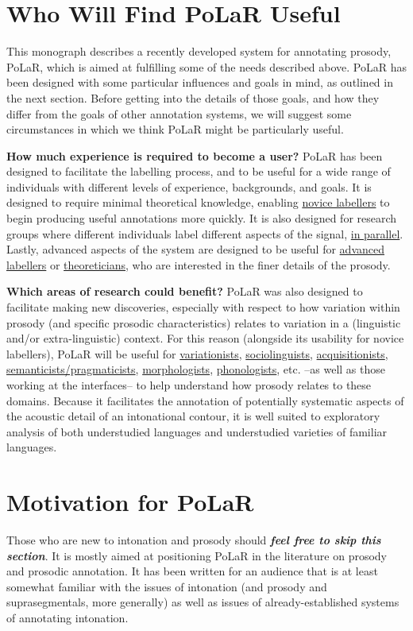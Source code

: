 \documentclass[11pt, twoside]{memoir}
\begin{document}
\section{Who Will Find PoLaR Useful}\label{sec:who-will-find-polar-useful}

This monograph describes a recently developed system for annotating prosody, PoLaR, which is  aimed at fulfilling some of the needs described above. PoLaR has been designed with some particular influences and goals in mind, as outlined in the next section. Before getting into the details of those goals, and how they differ from the goals of other annotation systems, we will suggest some circumstances in which we think PoLaR might be particularly useful.

\textbf{How much experience is required to become a user?} PoLaR has been designed to facilitate the labelling process, and to be useful for a wide range of individuals with different levels of experience, backgrounds, and goals. It is designed to require minimal theoretical knowledge, enabling \uline{novice labellers} to begin producing useful annotations more quickly. It is also designed for research groups where different individuals label different aspects of the signal, \uline{in parallel}. Lastly, advanced aspects of the system are designed to be useful for \uline{advanced labellers} or \uline{theoreticians}, who are interested in the finer details of the prosody.

\textbf{Which areas of research could benefit?} PoLaR was also designed to facilitate making new discoveries, especially with respect to how variation within prosody (and specific prosodic characteristics) relates to variation in a (linguistic and/or extra-linguistic) context. For this reason (alongside its usability for novice labellers), PoLaR will be useful for \uline{variationists}, \uline{sociolinguists}, \uline{acquisitionists}, \uline{semanticists\slash pragmaticists}, \uline{morphologists}, \uline{phonologists}, etc. --as well as those working at the interfaces-- to help understand how prosody relates to these domains. Because it facilitates the annotation of potentially systematic aspects of the acoustic detail of an intonational contour, it is well suited to exploratory analysis of both understudied languages and understudied varieties of familiar languages.


\section{Motivation for PoLaR}
Those who are new to intonation and prosody should \textit{\textbf{feel free to skip this section}}. It is mostly aimed at positioning PoLaR in the literature on prosody and prosodic annotation. It has been written for an audience that is at least somewhat familiar with the issues of intonation (and prosody and suprasegmentals, more generally) as well as issues of already-established systems of annotating intonation.
\end{document}
